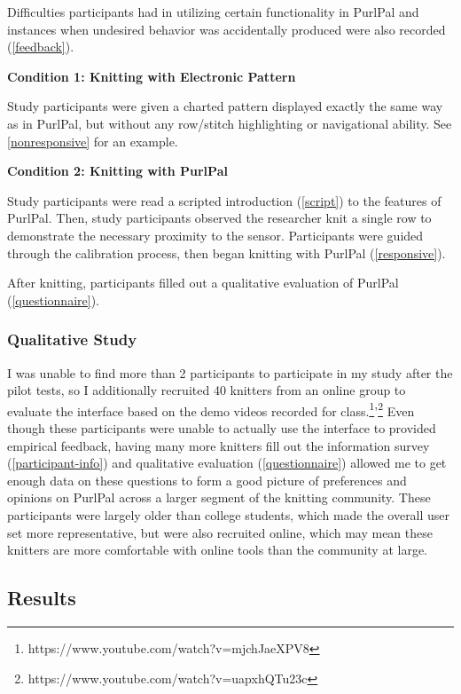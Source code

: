 \documentclass[11pt,twocolumn]{article}
\begin{document}
Difficulties participants had in utilizing certain functionality in PurlPal and instances when undesired behavior was accidentally produced were also recorded (\ref{feedback}).

\medskip

\textbf{Condition 1: Knitting with Electronic Pattern}

Study participants were given a charted pattern displayed exactly the same way as in PurlPal, but without any row/stitch highlighting or navigational ability. See \ref{nonresponsive} for an example.

\medskip

\textbf{Condition 2: Knitting with PurlPal}

Study participants were read a scripted introduction (\ref{script}) to the features of PurlPal.
Then, study participants observed the researcher knit a single row to demonstrate the necessary proximity to the sensor.
Participants were guided through the calibration process, then began knitting with PurlPal (\ref{responsive}).

\medskip

After knitting, participants filled out a qualitative evaluation of PurlPal (\ref{questionnaire}).

\subsubsection{Qualitative Study}

I was unable to find more than 2 participants to participate in my study after the pilot tests, so I additionally recruited 40 knitters from an online group to evaluate the interface based on the demo videos recorded for class.\footnote{https://www.youtube.com/watch?v=mjchJaeXPV8}'\footnote{https://www.youtube.com/watch?v=uapxhQTu23c}
Even though these participants were unable to actually use the interface to provided empirical feedback, having many more knitters fill out the information survey (\ref{participant-info}) and qualitative evaluation (\ref{questionnaire}) allowed me to get enough data on these questions to form a good picture of preferences and opinions on PurlPal across a larger segment of the knitting community.
These participants were largely older than college students, which made the overall user set more representative, but were also recruited online, which may mean these knitters are more comfortable with online tools than the community at large.

\subsection{Results} \label{studyResults}
\end{document}
